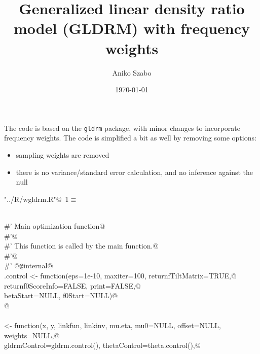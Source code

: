 \documentclass[reqno]{amsart}
\title{Generalized linear density ratio model (GLDRM) with frequency weights}
\author{Aniko Szabo}
\date{\today}
\renewcommand{\NWtarget}[2]{\hypertarget{#1}{#2}}
\begin{document}
\maketitle

The code is based on the \texttt{gldrm} package, with minor changes to incorporate frequency weights. The code is simplified a bit as well by removing some options:
\begin{itemize}
  \item sampling weights are removed
  \item there is no variance/standard error calculation, and no inference against the null
\end{itemize}


\begin{flushleft} \small\label{scrap1}\raggedright\small
\NWtarget{nuweb1}{} \verb@"../R/wgldrm.R"@\nobreak\ {\footnotesize {1}}$\equiv$
\vspace{-1ex}
\begin{list}{}{} \item
\mbox{}\verb@@\\
\mbox{}\verb@#' Main optimization function@\\
\mbox{}\verb@#'@\\
\mbox{}\verb@#' This function is called by the main  function.@\\
\mbox{}\verb@#'@\\
\mbox{}\verb@#' @{\tt @}\verb@keywords internal@\\
\mbox{}\verb@gldrm.control <- function(eps=1e-10, maxiter=100, returnfTiltMatrix=TRUE,@\\
\mbox{}\verb@                          returnf0ScoreInfo=FALSE, print=FALSE,@\\
\mbox{}\verb@                          betaStart=NULL, f0Start=NULL)@\\
\mbox{}@\\
\mbox{}\verb@@\\
\mbox{}\verb@gldrmFit <- function(x, y, linkfun, linkinv, mu.eta, mu0=NULL, offset=NULL, weights=NULL,@\\
\mbox{}\verb@                     gldrmControl=gldrm.control(), thetaControl=theta.control(),@\\

\end{list}
\end{flushleft}
\end{document}
